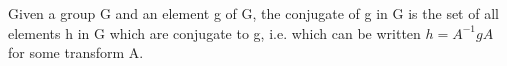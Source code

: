 Given a group G and an element g of G, the conjugate of g in G is the set of
all elements h in G which are conjugate to g, i.e. which can be written $h=A^{-1}gA$  for some transform A.